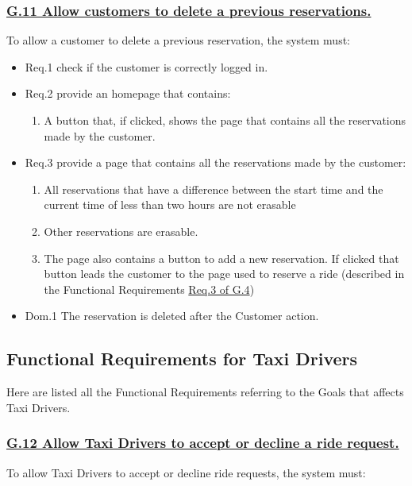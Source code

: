 \documentclass{report}
\begin{document}
			\subsubsection{\lbrack \hyperref[sec:g11]{G.11 Allow customers to delete a previous reservations.}\rbrack}\label{sec:frs11}
			To allow a customer to delete a previous reservation, the system must:

				\begin{itemize}
					\item \lbrack Req.1\rbrack \label{sec:fr1_g11} check if the customer is correctly logged in.
					\item \lbrack Req.2\rbrack \label{sec:fr2_g11} provide an homepage that contains:
						\begin{enumerate}
							\item A button that, if clicked, shows the page that contains all the reservations made by the customer.
						\end{enumerate}
					\item \lbrack Req.3\rbrack \label{sec:fr3_g11} provide a page that contains all the reservations made by the customer:
						\begin{enumerate}
							\item All reservations that have a difference between the start time and the current time of less than two hours are not erasable
							\item Other reservations are erasable.
							\item The page also contains a button to add a new reservation. If clicked that button leads the customer to the page used to reserve a ride (described in the Functional Requirements \hyperref[sec:fr3_g4]{Req.3 of G.4})
						\end{enumerate}
					\item \lbrack Dom.1\rbrack \label{sec:da1_g11} The reservation is deleted after the Customer action.
				\end{itemize}

		\subsection{Functional Requirements for Taxi Drivers}
		Here are listed all the Functional Requirements referring to the Goals that affects Taxi Drivers.

			\subsubsection{\lbrack \hyperref[sec:g12]{G.12 Allow Taxi Drivers to accept or decline a ride request.}\rbrack}\label{sec:frs12}
			To allow Taxi Drivers to accept or decline ride requests, the system must:
\end{document}
